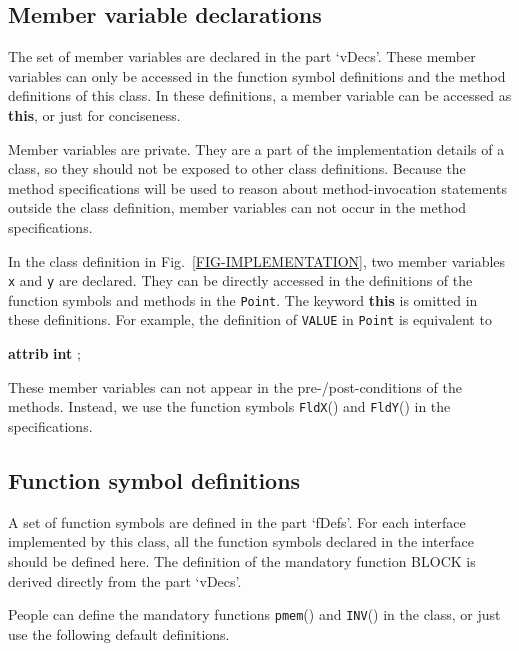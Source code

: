 \documentclass[fleqn]{llncs}
\begin{document}
\subsection{Member variable declarations}
The set of member variables are declared in the part `vDecs'. These member variables can only be accessed in the function symbol definitions and the method definitions of this class. In these definitions, a member variable  can be accessed as \textbf{this}{\fldacc}, or just  for conciseness.

Member variables are private. They are a part of the implementation details of a class, so they should not be exposed to other class definitions. Because the method specifications will be used to reason about method-invocation statements outside the class definition, member variables can not occur in the method specifications.

\begin{example}
In the class definition in Fig.~\ref{FIG-IMPLEMENTATION}, two member variables \texttt{x} and \texttt{y} are declared. They can be directly accessed in the definitions of the function
symbols and methods in the \texttt{Point}. The keyword \textbf{this} is omitted in these definitions. For example, the definition of \texttt{VALUE} in \texttt{Point} is equivalent to
\begin{center}\textbf{attrib} \textbf{int} ;\\\end{center}
These member variables can not appear in the pre-/post-conditions of the methods. Instead, we use the function symbols \texttt{FldX}() and \texttt{FldY}() in the specifications.
\hfill
\end{example}

\subsection{Function symbol definitions}
A set of function symbols are defined in the part `fDefs'. For each interface implemented by this class, all the function symbols
declared in the interface should be defined here.
The definition of the mandatory function BLOCK is derived directly from the part `vDecs'.

People can define the mandatory functions \texttt{pmem}() and \texttt{INV}() in the class,
or just use the following default definitions.
\begin{center}
\begin{minipage}{0.6\textwidth}
\\

\end{minipage}
\end{center}
\end{document}
